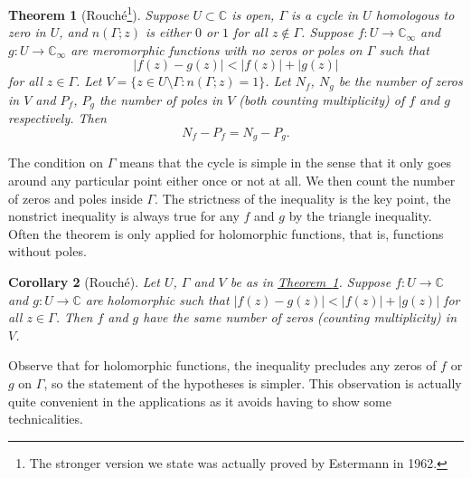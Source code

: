 \documentclass[12pt,openany]{book}
\newcommand{\sabs}[1]{\lvert {#1} \rvert}
\newcommand{\C}{{\mathbb{C}}}
\theoremstyle{plain}
\newtheorem{thm}{Theorem}[section]
\newtheorem{cor}[thm]{Corollary}
\theoremstyle{remark}
\theoremstyle{definition}
\theoremstyle{exercise}
\theoremstyle{example}
\newcommand{\thmref}[1]{\hyperref[#1]{Theorem~\ref*{#1}}}
\begin{document}
\begin{thm}[Rouch\'e\footnote{%
The stronger version we state was actually proved by Estermann in 1962.}]\label{thm:rouche}
\pagebreak[2]
Suppose $U \subset \C$ is open, $\Gamma$ is a cycle
in $U$ homologous to zero in $U$,
and $n(\Gamma;z)$ is either $0$ or $1$ for all $z \notin \Gamma$.
Suppose $f \colon U \to \C_\infty$ and $g \colon U \to \C_\infty$
are meromorphic functions with no zeros or poles on
$\Gamma$ such that
\begin{equation*}
\sabs{f(z)-g(z)} < \sabs{f(z)}+\sabs{g(z)}
\end{equation*}
for all $z \in \Gamma$.
Let $V = \bigl\{ z \in U \setminus \Gamma : n(\Gamma;z) = 1 \bigr\}$.
Let $N_f$, $N_g$ be the number of zeros in $V$
and $P_f$, $P_g$ the number of poles in $V$ (both counting multiplicity)
of $f$ and $g$ respectively.
Then
\begin{equation*}
N_f - P_f = 
N_g - P_g.
\end{equation*}
\end{thm}

The condition on $\Gamma$ means that the
cycle is simple in the sense
that it only goes around any particular point either once or not at all.
We then count the number of zeros and poles inside $\Gamma$.
The strictness of the inequality is the key point,
the nonstrict inequality is always true for any $f$ and $g$ by the triangle
inequality.
Often the theorem is only applied for holomorphic functions, that is,
functions without poles.

\begin{cor}[Rouch\'e]\label{thm:rouche2}
Let $U$, $\Gamma$ and $V$ be as in \thmref{thm:rouche}.
Suppose $f \colon U \to \C$ and $g \colon U \to \C$
are holomorphic such that
$\sabs{f(z)-g(z)} < \sabs{f(z)}+\sabs{g(z)}$
for all $z \in \Gamma$.  Then $f$ and $g$ have the same number of zeros
(counting multiplicity) in $V$.
\end{cor}

Observe that for holomorphic functions,
the inequality precludes any zeros of $f$ or
$g$ on $\Gamma$, so the statement of the hypotheses is simpler.
This observation is actually quite convenient in the
applications as it avoids having to show some technicalities.
\end{document}
